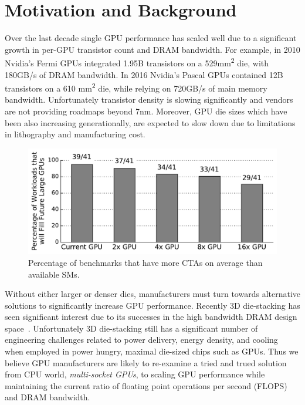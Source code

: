 \section{Motivation and Background}
\label{sec:background}

Over the last decade single GPU performance has scaled well due to a 
significant growth in per-GPU transistor count and DRAM bandwidth. For example, 
in 2010 Nvidia's Fermi GPUs integrated 1.95B transistors on a 
529mm\textsuperscript{2} die, with 180GB/s of DRAM bandwidth.  In 2016 Nvidia's 
Pascal GPUs contained 12B transistors on a 610 mm\textsuperscript{2} die, while 
relying on 720GB/s of main memory bandwidth. Unfortunately transistor density is 
slowing significantly and vendors are not providing roadmaps beyond 7nm. 
Moreover, GPU die sizes which have been also increasing generationally, are 
expected to slow down due to limitations in lithography and manufacturing cost.

\begin{figure}[t] 
    \centering
    \includegraphics[width=1.0\columnwidth]{figures/plot_ctas_per_sm.pdf}
    \caption{Percentage of benchmarks that have more CTAs on average than 
available SMs.}
    \label{fig:ctas}
    \vspace{-.2in}
\end{figure}

Without either larger or denser dies, manufacturers must turn towards 
alternative solutions to significantly increase GPU performance.  Recently 3D 
die-stacking has seen significant interest due to its successes in the high 
bandwidth DRAM design space~\cite{HBM}. Unfortunately 3D die-stacking still has 
a significant number of engineering challenges related to power delivery, 
energy density, and cooling~\cite{verbree2010cost} when employed in power 
hungry, maximal die-sized chips such as GPUs. Thus we believe GPU manufacturers 
are likely to re-examine a tried and trued solution from CPU world, 
\textit{multi-socket GPUs}, to scaling GPU performance while maintaining the 
current ratio of floating point operations per second (FLOPS) and DRAM 
bandwidth.

